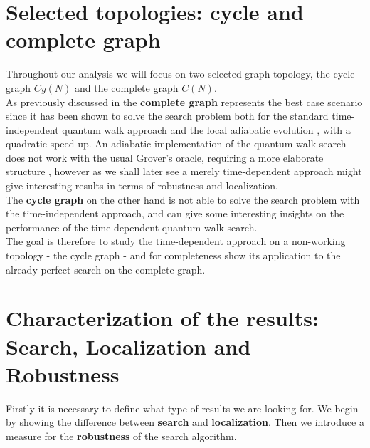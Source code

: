 \clearpage
\section{Selected topologies: cycle and complete graph}
    Throughout our analysis we will focus on two selected graph topology, the cycle graph $Cy(N)$ and the complete graph $C(N)$. \\

    As previously discussed in  the \textbf{complete graph} represents the best case scenario since it has been shown to solve the search problem both for the standard time-independent quantum walk approach \cite{Childs2004} and the local adiabatic evolution \cite{Roland2002}, with a quadratic speed up. An adiabatic implementation of the quantum walk search does not work with the usual Grover's oracle, requiring a more elaborate structure \cite{Wong2016}, however as we shall later see a merely time-dependent approach might give interesting results in terms of robustness and localization.  \\

    The \textbf{cycle graph} on the other hand is not able to solve the search problem with the time-independent approach, and can give some interesting insights on the performance of the time-dependent quantum walk search.  \\
    The goal is therefore to study the time-dependent approach on a non-working topology - the cycle graph - and for completeness show its application to the already perfect search on the complete graph.

\section{Characterization of the results: Search, Localization and Robustness}
    Firstly it is necessary to define what type of results we are looking for. We begin by showing the difference between \textbf{search} and \textbf{localization}. Then we introduce a measure for the \textbf{robustness} of the search algorithm.


